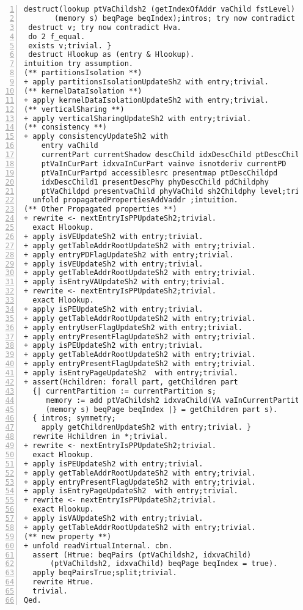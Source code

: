 \begin{appendices}
\begin{lstlisting}[xleftmargin=-.1\textwidth,
xrightmargin=-.1\textwidth,
mathescape=true,numbers=left]
 destruct(lookup ptVaChildsh2 (getIndexOfAddr vaChild fstLevel)
       (memory s) beqPage beqIndex);intros; try now contradict Hva.
 destruct v; try now contradict Hva.
 do 2 f_equal.
 exists v;trivial. }
 destruct Hlookup as (entry & Hlookup).
intuition try assumption.
(** partitionsIsolation **)
+ apply partitionsIsolationUpdateSh2 with entry;trivial.
(** kernelDataIsolation **)
+ apply kernelDataIsolationUpdateSh2 with entry;trivial.
(** verticalSharing **)
+ apply verticalSharingUpdateSh2 with entry;trivial. 
(** consistency **)
+ apply consistencyUpdateSh2 with
    entry vaChild
    currentPart currentShadow descChild idxDescChild ptDescChild
    ptVaInCurPart idxvaInCurPart vainve isnotderiv currentPD
    ptVaInCurPartpd accessiblesrc presentmap ptDescChildpd 
    idxDescChild1 presentDescPhy phyDescChild pdChildphy 
    ptVaChildpd presentvaChild phyVaChild sh2Childphy level;trivial.
  unfold propagatedPropertiesAddVaddr ;intuition.
(** Other Propagated properties **)
+ rewrite <- nextEntryIsPPUpdateSh2;trivial.
  exact Hlookup.
+ apply isVEUpdateSh2 with entry;trivial.
+ apply getTableAddrRootUpdateSh2 with entry;trivial.
+ apply entryPDFlagUpdateSh2 with entry;trivial.
+ apply isVEUpdateSh2 with entry;trivial.
+ apply getTableAddrRootUpdateSh2 with entry;trivial.
+ apply isEntryVAUpdateSh2 with entry;trivial.
+ rewrite <- nextEntryIsPPUpdateSh2;trivial.
  exact Hlookup.
+ apply isPEUpdateSh2 with entry;trivial.
+ apply getTableAddrRootUpdateSh2 with entry;trivial.
+ apply entryUserFlagUpdateSh2 with entry;trivial.
+ apply entryPresentFlagUpdateSh2 with entry;trivial.
+ apply isPEUpdateSh2 with entry;trivial.
+ apply getTableAddrRootUpdateSh2 with entry;trivial.
+ apply entryPresentFlagUpdateSh2 with entry;trivial.
+ apply isEntryPageUpdateSh2  with entry;trivial.
+ assert(Hchildren: forall part, getChildren part
  {| currentPartition := currentPartition s;
     memory := add ptVaChildsh2 idxvaChild(VA vaInCurrentPartition) 
     (memory s) beqPage beqIndex |} = getChildren part s).
  { intros; symmetry;
    apply getChildrenUpdateSh2 with entry;trivial. } 
  rewrite Hchildren in *;trivial.
+ rewrite <- nextEntryIsPPUpdateSh2;trivial.
  exact Hlookup.
+ apply isPEUpdateSh2 with entry;trivial.
+ apply getTableAddrRootUpdateSh2 with entry;trivial.
+ apply entryPresentFlagUpdateSh2 with entry;trivial.
+ apply isEntryPageUpdateSh2  with entry;trivial.
+ rewrite <- nextEntryIsPPUpdateSh2;trivial.
  exact Hlookup.
+ apply isVAUpdateSh2 with entry;trivial.
+ apply getTableAddrRootUpdateSh2 with entry;trivial.
(** new property **)
+ unfold readVirtualInternal. cbn.
  assert (Htrue: beqPairs (ptVaChildsh2, idxvaChild) 
      (ptVaChildsh2, idxvaChild) beqPage beqIndex = true). 
  apply beqPairsTrue;split;trivial.
  rewrite Htrue.
  trivial.
Qed.
\end{lstlisting} \pagebreak


\end{appendices}
